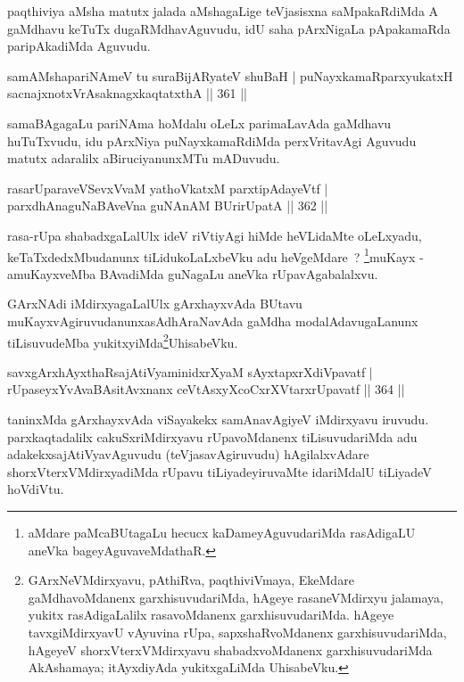 \begin{artha}
paqthiviya aMsha matutx jalada aMshagaLige teVjasisxna saMpakaRdiMda A gaMdhavu keTuTx dugaRMdhavAguvudu, idU saha pArxNigaLa pApakamaRda paripAkadiMda Aguvudu.
\end{artha}

\begin{shl}
samAMshapariNAmeV tu suraBijARyateV shuBaH |
puNayxkamaRparxyukatxH sacnajxnotxVrAsaknagxkaqtatxthA \hfill || 361 ||
\end{shl}

\begin{artha}
samaBAgagaLu pariNAma hoMdalu oLeLx parimaLavAda gaMdhavu huTuTxvudu, idu pArxNiya puNayxkamaRdiMda perxVritavAgi Aguvudu matutx adaralilx aBiruciyanunxMTu mADuvudu.
\end{artha}

\begin{shl}
rasarUparaveVSevxVvaM yathoVkatxM parxtipAdayeVtf |
parxdhAnaguNaBAveVna guNAnAM BUrirUpatA \hfill || 362 ||
\end{shl}

\begin{artha}
rasa-rUpa shabadxgaLalUlx ideV riVtiyAgi hiMde heVLidaMte oLeLxyadu, keTaTxdedxMbudanunx tiLidukoLaLxbeVku adu heVgeMdare~? \mdash \footnote{aMdare paMcaBUtagaLu hecucx kaDameyAguvudariMda rasAdigaLU aneVka bageyAguvaveMdathaR.}muKayx - amuKayxveMba BAvadiMda guNagaLu aneVka rUpavAgabalalxvu.
\end{artha}

\begin{artha}
GArxNAdi iMdirxyagaLalUlx gArxhayxvAda BUtavu muKayxvAgiruvudanunx\break asAdhAraNavAda gaMdha modalAdavugaLanunx tiLisuvudeMba yukitxyiMda\break \footnote{GArxNeVMdirxyavu, pAthiRva, paqthiviVmaya, EkeMdare gaMdhavoMdanenx garxhisuvudariMda, hAgeye rasaneVMdirxyu jalamaya, yukitx rasAdigaLalilx rasavoMdanenx garxhisuvudariMda. hAgeye tavxgiMdirxyavU vAyuvina rUpa, sapxshaRvoMdanenx garxhisuvudariMda, hAgeyeV shorxVterxVMdirxyavu shabadxvoMdanenx garxhisuvudariMda AkAshamaya; itAyxdiyAda yukitxgaLiMda UhisabeVku.}UhisabeVku.
\end{artha}

\begin{shl}
savxgArxhAyxthaRsajAtiVyaminidxrXyaM sAyxtapxrXdiVpavatf |
rUpaseyxYvAvaBAsitAvxnanx ceVtAsxyXcoCxrXVtarxrUpavatf \hfill || 364 ||
\end{shl}

\begin{artha}
taninxMda gArxhayxvAda viSayakekx samAnavAgiyeV iMdirxyavu iruvudu. parxkaqtadalilx cakuSxriMdirxyavu rUpavoMdanenx tiLisuvudariMda adu adakekx\break sajAtiVyavAguvudu (teVjasavAgiruvudu) hAgilalxvAdare shorxVterxVMdirxyadiMda rUpavu tiLiyadeyiruvaMte idariMdalU tiLiyadeV hoVdiVtu.
\end{artha}

